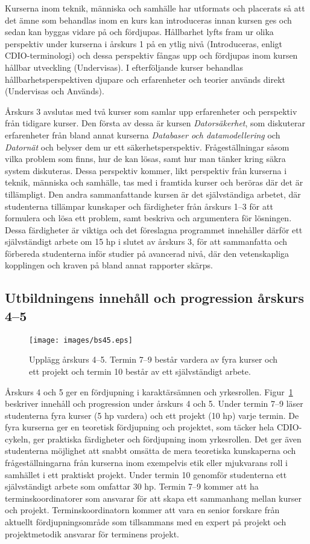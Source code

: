Kurserna inom teknik, människa och samhälle har utformats och placerats så att det ämne som behandlas inom en kurs kan introduceras innan kursen ges och sedan kan byggas vidare på och fördjupas. Hållbarhet lyfts fram ur olika perspektiv under kurserna i årskurs 1 på en ytlig nivå (Introduceras, enligt CDIO-terminologi) och dessa perspektiv fångas upp och fördjupas inom kursen hållbar utveckling (Undervisas). I efterföljande kurser behandlas hållbarhetsperspektiven djupare och erfarenheter och teorier används direkt (Undervisas och Används).

Årskurs 3 avslutas med två kurser som samlar upp erfarenheter och perspektiv från tidigare kurser. Den första av dessa är kursen \emph{Datorsäkerhet}, som diskuterar erfarenheter från bland annat kurserna \emph{Databaser och datamodellering} och \emph{Datornät} och belyser dem ur ett säkerhetsperspektiv. Frågeställningar såsom vilka problem som finns, hur de kan lösas, samt hur man tänker kring säkra system diskuteras. Dessa perspektiv kommer, likt perspektiv från kurserna i teknik, människa och samhälle, tas med i framtida kurser och beröras där det är tillämpligt. Den andra sammanfattande kursen är det självständiga arbetet, där studenterna tillämpar kunskaper och färdigheter från årskurs 1–3 för att formulera och lösa ett problem, samt beskriva och argumentera för lösningen. Dessa färdigheter är viktiga och det föreslagna programmet innehåller därför ett självständigt arbete om 15 hp i slutet av årskurs 3, för att sammanfatta och förbereda studenterna inför studier på avancerad nivå, där den vetenskapliga kopplingen och kraven på bland annat rapporter skärps.

\subsection{Utbildningens innehåll och progression årskurs 4--5}

\begin{figure}[tbp]
\centering
\texttt{[image: images/bs45.eps]}
\caption{Upplägg årskurs 4--5. Termin 7--9 består vardera av fyra kurser och ett projekt och termin 10 består av ett självständigt arbete.\label{fig:bs45}}
\end{figure}

Årskurs 4 och 5 ger en fördjupning i karaktärsämnen och yrkesrollen. Figur~\ref{fig:bs45} beskriver innehåll och progression under årskurs 4 och 5. Under termin 7–9 läser studenterna fyra kurser (5 hp vardera) och ett projekt (10 hp) varje termin. De fyra kurserna ger en teoretisk fördjupning och projektet, som täcker hela CDIO-cykeln, ger praktiska färdigheter och fördjupning inom yrkesrollen. Det ger även studenterna möjlighet att snabbt omsätta de mera teoretiska kunskaperna och frågeställningarna från kurserna inom exempelvis etik eller mjukvarans roll i samhället i ett praktiskt projekt. Under termin 10 genomför studenterna ett självständigt arbete som omfattar 30 hp. Termin 7–9 kommer att ha terminskoordinatorer som ansvarar för att skapa ett sammanhang mellan kurser och projekt. Terminskoordinatorn kommer att vara en senior forskare från aktuellt fördjupningsområde som tillsammans med en expert på projekt och projektmetodik ansvarar för terminens projekt.

